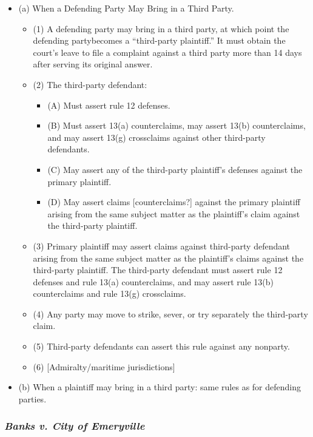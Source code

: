 \begin{itemize}
    \item (a) When a Defending Party May Bring in a Third Party.
    \begin{itemize}
        \item (1) A defending party may bring in a third party, at which point the defending partybecomes a ``third-party plaintiff.'' It must obtain the court's leave to file a complaint against a third party more than 14 days after serving its original answer.
        \item (2) The third-party defendant:
        \begin{itemize}
            \item (A) Must assert rule 12 defenses.
            \item (B) Must assert 13(a) counterclaims, may assert 13(b) counterclaims, and may assert 13(g) crossclaims against other third-party defendants.
            \item (C) May assert any of the third-party plaintiff's defenses against the primary plaintiff.
            \item (D) May assert claims [counterclaims?] against the primary plaintiff arising from the same subject matter as the plaintiff's claim against the third-party plaintiff.
        \end{itemize}
        \item (3) Primary plaintiff may assert claims against third-party defendant arising from the same subject matter as the plaintiff's claims against the third-party plaintiff. The third-party defendant must assert rule 12 defenses and rule 13(a) counterclaims, and may assert rule 13(b) counterclaims and rule 13(g) crossclaims.
        \item (4) Any party may move to strike, sever, or try separately the third-party claim.
        \item (5) Third-party defendants can assert this rule against any nonparty.
        \item (6) [Admiralty/maritime jurisdictions]
    \end{itemize}
    \item (b) When a plaintiff may bring in a third party: same rules as for defending parties.
\end{itemize}

\subsubsection{\emph{Banks v. City of Emeryville}}

